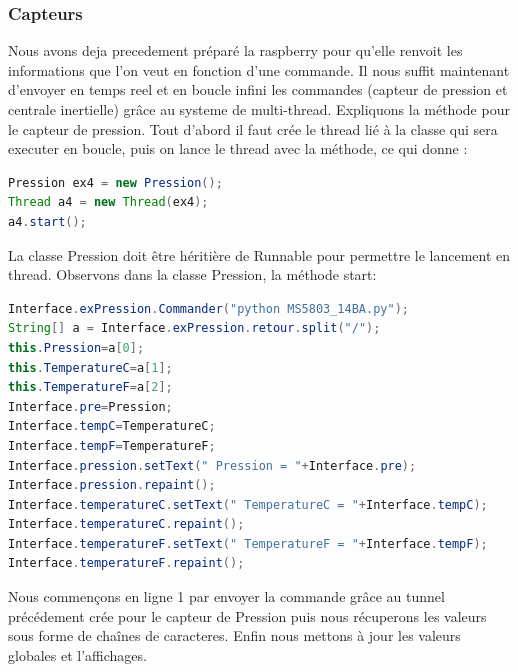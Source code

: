 \documentclass[a4paper,11pt]{report}
\begin{document}
		\subsubsection{Capteurs}
		Nous avons deja precedement préparé la raspberry pour qu'elle renvoit les informations que l'on veut en fonction d'une commande. Il nous suffit maintenant d'envoyer en temps reel et en boucle infini les commandes (capteur de pression et centrale inertielle) grâce au systeme de multi-thread.
		\newline Expliquons la méthode pour le capteur de pression. Tout d'abord il faut crée le thread lié à la classe qui sera executer en boucle, puis on lance le thread avec la méthode, ce qui donne :
		\begin{lstlisting}[language=java]
Pression ex4 = new Pression();
Thread a4 = new Thread(ex4);
a4.start();
		\end{lstlisting}
		La classe Pression doit être héritière de Runnable pour permettre le lancement en thread.
		\newline Observons dans la classe Pression, la méthode start:
		\begin{lstlisting}[language=java]
Interface.exPression.Commander("python MS5803_14BA.py");
String[] a = Interface.exPression.retour.split("/");
this.Pression=a[0];
this.TemperatureC=a[1];
this.TemperatureF=a[2];
Interface.pre=Pression;
Interface.tempC=TemperatureC;
Interface.tempF=TemperatureF;
Interface.pression.setText(" Pression = "+Interface.pre);
Interface.pression.repaint();
Interface.temperatureC.setText(" TemperatureC = "+Interface.tempC);
Interface.temperatureC.repaint();
Interface.temperatureF.setText(" TemperatureF = "+Interface.tempF);
Interface.temperatureF.repaint();
		\end{lstlisting}
		Nous commençons en ligne 1 par envoyer la commande grâce au tunnel précédement crée pour le capteur de Pression puis nous récuperons les valeurs sous forme de chaînes de caracteres.
		\newline Enfin nous mettons à jour les valeurs globales et l'affichages.
		
\end{document}
